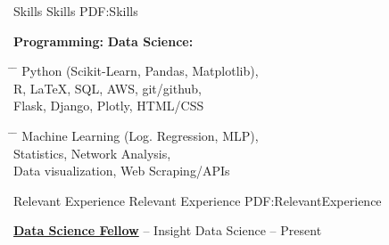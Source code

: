 \documentclass[letterpaper,MMMyyyy,nonstopmode]{simpleresumecv}
\begin{document}
\begin{Body}


\Section
{Skills}
{Skills}
{PDF:Skills}
\Entry
\begin{Detail}
{\bf Programming:} \hspace{5.2cm} {\bf Data Science:}

\parbox{0.5\textwidth}{ %
\begin{tabbing}

\hspace{3cm} \= \hspace{4cm} \= \kill
\newline
Python (Scikit-Learn, Pandas, Matplotlib), \\
R, LaTeX, SQL, AWS, git/github, \\
Flask, Django, Plotly, HTML/CSS%
\end{tabbing}}
\hfill %
\parbox{0.5\textwidth}{ %
\begin{tabbing}
\hspace{3cm} \= \hspace{4cm} \= \kill
Machine Learning (Log. Regression, MLP), \\%
Statistics, Network Analysis,\\
Data visualization, Web Scraping/APIs

\end{tabbing}}
\end{Detail}

\vspace{3mm}


\Section
{Relevant Experience}
{Relevant Experience}
{PDF:RelevantExperience}

\Entry
\begin{Detail}
\href{https://www.insightdatascience.com/}
{\textbf{Data Science Fellow}} -- Insight Data Science \hfill {} \hspace{1mm} -- \hspace{1mm} Present



\end{Detail}
\end{Body}
\end{document}
